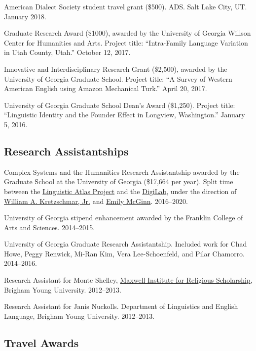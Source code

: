 \documentclass[
]{article}
\begin{document}
American Dialect Society student travel grant (\$500). ADS. Salt Lake
City, UT. January 2018.

Graduate Research Award (\$1000), awarded by the University of Georgia
Willson Center for Humanities and Arts. Project title: ``Intra-Family
Language Variation in Utah County, Utah.'' October 12, 2017.

Innovative and Interdisciplinary Research Grant (\$2,500), awarded by
the University of Georgia Graduate School. Project title: ``A Survey of
Western American English using Amazon Mechanical Turk.'' April 20, 2017.

University of Georgia Graduate School Dean's Award (\$1,250). Project
title: ``Linguistic Identity and the Founder Effect in Longview,
Washington.'' January 5, 2016.

\hypertarget{research-assistantships}{%
\subsection{Research Assistantships}\label{research-assistantships}}

Complex Systems and the Humanities Research Assistantship awarded by the
Graduate School at the University of Georgia (\$17,664 per year). Split
time between the \href{http://www.lap.uga.edu}{Linguistic Atlas Project}
and the \href{http://digi.uga.edu/digilab/}{DigiLab}, under the
direction of
\href{https://www.english.uga.edu/directory/people/william-kretzschmar}{William
A. Kretzschmar, Jr.} and \href{https://emilymcginn.com}{Emily McGinn}.
2016--2020.

University of Georgia stipend enhancement awarded by the Franklin
College of Arts and Sciences. 2014--2015.

University of Georgia Graduate Research Assistantship. Included work for
Chad Howe, Peggy Renwick, Mi-Ran Kim, Vera Lee-Schoenfeld, and Pilar
Chamorro. 2014--2016.

Research Assistant for Monte Shelley, \href{https://mi.byu.edu}{Maxwell
Institute for Religious Scholarship}, Brigham Young University.
2012--2013.

Research Assistant for Janis Nuckolls. Department of Linguistics and
English Language, Brigham Young University. 2012--2013.

\hypertarget{travel-awards}{%
\subsection{Travel Awards}\label{travel-awards}}
\end{document}
